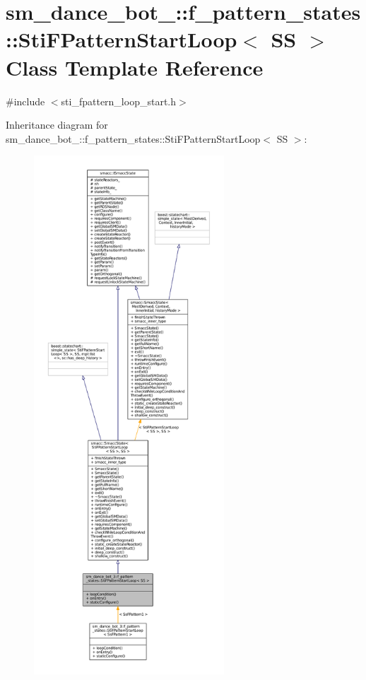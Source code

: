 \hypertarget{structsm__dance__bot__3_1_1f__pattern__states_1_1StiFPatternStartLoop}{}\section{sm\+\_\+dance\+\_\+bot\+\_\+:\+:f\+\_\+pattern\+\_\+states\+:\+:Sti\+F\+Pattern\+Start\+Loop$<$ SS $>$ Class Template Reference}
\label{structsm__dance__bot__3_1_1f__pattern__states_1_1StiFPatternStartLoop}


{\ttfamily \#include $<$sti\+\_\+fpattern\+\_\+loop\+\_\+start.\+h$>$}



Inheritance diagram for sm\+\_\+dance\+\_\+bot\+\_\+:\+:f\+\_\+pattern\+\_\+states\+:\+:Sti\+F\+Pattern\+Start\+Loop$<$ SS $>$\+:
\nopagebreak
\begin{figure}[H]
\begin{center}
\leavevmode
\includegraphics[height=550pt]{structsm__dance__bot__3_1_1f__pattern__states_1_1StiFPatternStartLoop__inherit__graph}
\end{center}
\end{figure}


